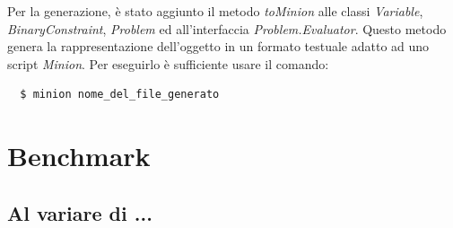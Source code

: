 \documentclass[a4paper,12pt,italian]{article}
\begin{document}
Per la generazione, \`e stato aggiunto il metodo \textit{toMinion}
alle classi \textit{Variable}, \textit{BinaryConstraint},
\textit{Problem} ed all'interfaccia \textit{Problem.Evaluator}. Questo
metodo genera la rappresentazione dell'oggetto in un formato testuale
adatto ad uno script \textit{Minion}. Per eseguirlo \`e sufficiente
usare il comando:

\begin{verbatim}
  $ minion nome_del_file_generato
\end{verbatim}

\section{Benchmark}

\subsection{Al variare di ...}
\end{document}
